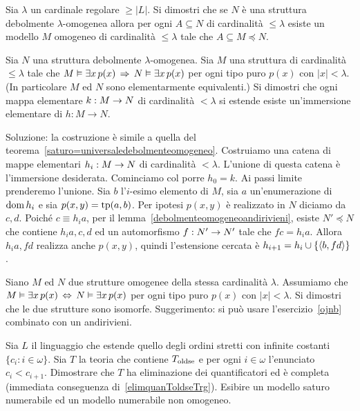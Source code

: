 \begin{exercise}\label{exomogeneonumerabile}
Sia $\lambda$ un cardinale regolare $\ge|L|$. Si dimostri che se $N$ \`e una struttura debolmente $\lambda$-omogenea allora per ogni $A\subseteq N$ di cardinalit\`a $\le\lambda$ esiste un modello $M$ omogeneo di cardinalit\`a $\le\lambda$ tale che $A\subseteq M\preceq N$.\QED 
\end{exercise}


\begin{exercise}[ (risolto)]\label{ojnb}
Sia $N$ una struttura debolmente $\lambda$-omogenea. Sia $M$ una struttura di cardinalit\`a $\le\lambda$ tale che $M\vDash\exists x\, p(x)\,\Rightarrow\,N\vDash\exists x\, p(x)$ per ogni tipo puro $p(x)$ con $|x|<\lambda$. (In particolare $M$ ed $N$ sono elementarmente equivalenti.) Si dimostri che ogni mappa elementare $k:M\rightarrow N$ di cardinalit\`a $<\lambda$ si estende esiste un'immersione elementare di $h:M\to N$.
\par
Soluzione: la costruzione \`e simile a quella del teorema~\ref{saturo=universaledebolmenteomogeneo}. Costruiamo una catena di mappe elementari $h_i:M\rightarrow N$ di cardinalit\`a $<\lambda$. L'unione di questa catena \`e l'immersione desiderata. Cominciamo col porre $h_0=k$. Ai passi limite prenderemo l'unione. Sia $b$ l'$i$-esimo elemento di $M$, sia $a$ un'enumerazione di $\mathop{\rm dom} h_i$ e sia $p(x,y)=\textrm{tp}(a,b)$. Per ipotesi $p(x,y)$ \`e realizzato in $N$ diciamo da $c,d$. Poich\'e $c\equiv h_ia$, per il lemma~\ref{debolmenteomogeneoandirivieni}, esiste $N'\preceq N$ che contiene $h_ia,c,d$ ed un automorfismo $f:N'\rightarrow N'$ tale che $fc=h_ia$. Allora $h_ia,fd$ realizza anche $p(x,y)$, quindi l'estensione cercata \`e $h_{i+1}=h_i\cup\{\langle b,fd\rangle\}$.\QED 
\end{exercise}


\begin{exercise}
Siano $M$ ed $N$ due strutture omogenee della stessa cardinalit\`a $\lambda$. Assumiamo che $M\vDash\exists x\, p(x)\,\Leftrightarrow\,N\vDash\exists x\, p(x)$ per ogni tipo puro $p(x)$ con $|x|<\lambda$. Si dimostri che le due strutture sono isomorfe. Suggerimento: si pu\`o usare l'esercizio~\ref{ojnb} combinato con un andirivieni.\QED 
\end{exercise}


\begin{exercise}\label{vaughtesempio}
Sia $L$ il linguaggio che estende quello degli ordini stretti con infinite costanti $\{c_i: i\in\omega\}$. Sia $T$ la teoria che contiene $T_{\rm oldse}$ e per ogni $i\in\omega$ l'enunciato $c_i<c_{i+1}$. Dimostrare che $T$ ha eliminazione dei quantificatori ed \`e completa (immediata conseguenza di~\ref{elimquanToldseTrg}). Esibire un modello saturo numerabile ed un modello numerabile non omogeneo.\QED 
\end{exercise}



